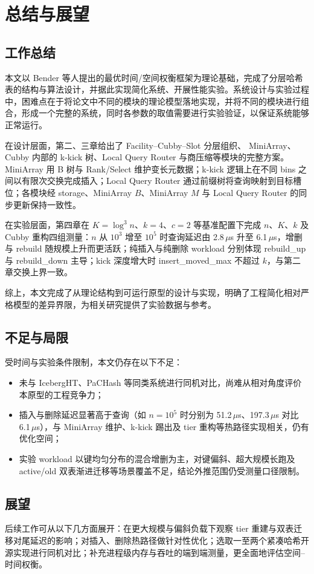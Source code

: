 \chapter{总结与展望}
\label{ch:concl}

\section{工作总结}

本文以 Bender 等人提出的最优时间/空间权衡框架\cite{bender2022otsh}为理论基础，完成了分层哈希表的结构与算法设计，并据此实现简化系统、开展性能实验。系统设计与实验过程中，困难点在于将论文中不同的模块的理论模型落地实现，并将不同的模块进行组合，形成一个完整的系统，同时各参数的取值需要进行实验验证，以保证系统能够正常运行。

在设计层面，第二、三章给出了 Facility--Cubby--Slot 分层组织、 MiniArray、Cubby 内部的 k-kick 树、Local Query Router 与商压缩等模块的完整方案。MiniArray 用 B 树与 Rank/Select 维护变长元数据；k-kick 逻辑上在不同 bins 之间以有限次交换完成插入；Local Query Router 通过前缀树将查询映射到目标槽位；各模块经 storage、MiniArray $B$、MiniArray $M$ 与 Local Query Router 的同步更新保持一致性。

在实验层面，第四章在 \(K=\log^3 n\)、\(k=4\)、\(c=2\) 等基准配置下完成 \(n\)、\(K\)、\(k\) 及 Cubby 重构四组测量：\(n\) 从 \(10^3\) 增至 \(10^5\) 时查询延迟由 2.8\,$\mu$s 升至 6.1\,$\mu$s，增删与 rebuild 随规模上升而更活跃；纯插入与纯删除 workload 分别体现 rebuild\_up 与 rebuild\_down 主导；kick 深度增大时 insert\_moved\_max 不超过 \(k\)，与第二章交换上界一致。

综上，本文完成了从理论结构到可运行原型的设计与实现，明确了工程简化相对严格模型的差异界限，为相关研究提供了实验数据与参考。

\section{不足与局限}

受时间与实验条件限制，本文仍存在以下不足：
\begin{itemize}
  \item 未与 IcebergHT\cite{pandey2023iceberght}、PaCHash\cite{kurpicz2023pachash} 等同类系统进行同机对比，尚难从相对角度评价本原型的工程竞争力；
  \item 插入与删除延迟显著高于查询（如 \(n=10^5\) 时分别为 51.2\,$\mu$s、197.3\,$\mu$s 对比 6.1\,$\mu$s），与 MiniArray 维护、k-kick 踢出及 tier 重构等热路径实现相关，仍有优化空间；
  \item 实验 workload 以键均匀分布的混合增删为主，对键偏斜、超大规模长跑及 active/old 双表渐进迁移等场景覆盖不足，结论外推范围仍受测量口径限制。
\end{itemize}

\section{展望}

后续工作可从以下几方面展开：在更大规模与偏斜负载下观察 tier 重建与双表迁移对尾延迟的影响；对插入、删除热路径做针对性优化；选取一至两个紧凑哈希开源实现进行同机对比；补充进程级内存与吞吐的端到端测量，更全面地评估空间--时间权衡\cite{kurpicz2023pachash,lehmann2026mphsurvey}。
